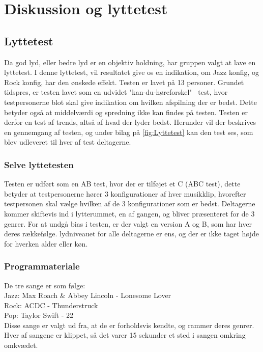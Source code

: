\section{Diskussion og lyttetest}

\subsection{Lyttetest}
Da god lyd, eller bedre lyd er en objektiv holdning, har gruppen valgt at lave en lyttetest. I denne lyttetest, vil resultatet give os en indikation, om Jazz konfig, og Rock konfig, har den ønskede effekt. Testen er lavet på 13 personer. Grundet tidspres, er testen lavet som en udvidet "kan-du-høreforskel" \ test, hvor testpersonerne blot skal give indikation om hvilken afspilning der er bedst. Dette betyder også at middelværdi og spredning ikke kan findes på testen. Testen er derfor en test af trends, altså af hvad der lyder bedst. Herunder vil der beskrives en gennemgang af testen, og under bilag på  \autoref{fig:Lyttetest} kan den test ses, som blev udleveret til hver af test deltagerne.  
 
\subsubsection{Selve lyttetesten}
Testen er udført som en AB test, hvor der er tilføjet et C (ABC test), dette betyder at testpersonerne hører 3 konfigurationer af hver musikklip, hvorefter testpersonen skal vælge hvilken af de 3 konfigurationer som er bedst. Deltagerne kommer skiftevis ind i lytterummet, en af gangen, og bliver præsenteret for de 3 genrer. For at undgå bias i testen, er der valgt en version A og B, som har hver deres rækkefølge. lydniveauet for alle deltagerne er ens, og der er ikke taget højde for hverken alder eller køn.    

\subsubsection{Programmateriale}
De tre sange er som følge: \\
Jazz: Max Roach \& Abbey Lincoln - Lonesome Lover \\
Rock: ACDC - Thunderstruck \\
Pop: Taylor Swift - 22 \\
Disse sange er valgt ud fra, at de er forholdsvis kendte, og rammer deres genrer. Hver af sangene er klippet, så det varer 15 sekunder et sted i sangen omkring omkvædet. 

